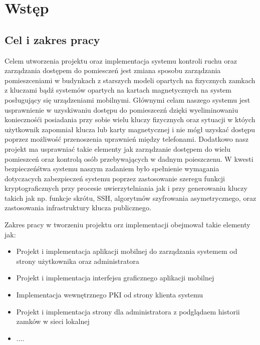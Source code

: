 \newpage\section{Wstęp}\label{sec:wstep}

\subsection{Cel i zakres pracy}
	Celem utworzenia projektu oraz implementacja systemu kontroli ruchu oraz zarządzania dostępem do pomiesczeń jest zmiana sposobu zarządzania pomieszceniami w budynkach z starszych modeli opartych na fizycznych zamkach z kluczami bądź systemów opartych na kartach magnetycznych na system posługujący się urządzeniami mobilnymi. Głównymi celam naszego systemu jest usprawnienie w uzyskiwaniu dostępu do pomieszcezń dzięki wyeliminowaniu koniecznośći posiadania przy sobie wielu kluczy fizycznych oraz sytuacji w któych użytkownik zapomniał klucza lub karty magnetycznej i nie mógł uzyskać dostępu poprzez możliwość przenoszenia uprawnień między telefonami. Dodatkowo nasz projekt ma usprawniać takie elementy jak zarządzanie dostępem do wielu pomieszceń oraz kontrolą osób przebywających w dadnym poieszczenu.
W kwesti bezpieczeńśtwa systemu naszym zadaniem było spełnienie wymagania dotyczacych zabezpieczeń systemu poprzez zastosowanie szeregu funkcji kryptograficznych przy procesie uwierzytelniania jak i
przy generowaniu kluczy takich jak np. funkcje skrótu, SSH, algorytmów szyfrowania
asymetrycznego, oraz zastosowania infrastruktury klucza publicznego.

Zakres pracy w tworzeniu projektu orz implementacji obejmował takie elementy jak:
\begin{itemize}
\item Projekt i implementacja aplikacji mobilnej do zarządzania systemem od strony użytkownika oraz administratora
\item Projekt i implementacja interfejsu graficznego aplikacji mobilnej
\item Implementacja wewnętrznego PKI od strony klienta systemu
\item Projekt i implementacja strony dla administratora z podglądaem historii zamków w sieci lokalnej
\item ....
\end{itemize}
